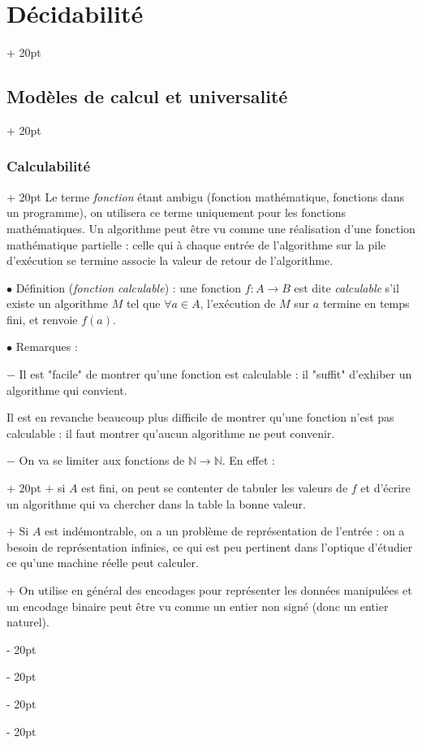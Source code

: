 \documentclass[a4paper, 12pt, twoside]{article}
\newcommand{\N}{\mathbb{N}} %
\newcommand{\ind}[1][20pt]{\advance\leftskip + #1}
\newcommand{\deind}[1][20pt]{\advance\leftskip - #1}
\newenvironment{indt}[2][20pt]{#2 \par \ind[#1]}{\par \deind} %
\begin{document}
\begin{indt}{\section{Décidabilité}}
\begin{indt}{\subsection{Modèles de calcul et universalité}}
\begin{indt}{\subsubsection{Calculabilité}}
                Le terme \emph{fonction} étant ambigu (fonction mathématique, fonctions dans un programme), on utilisera ce terme uniquement pour les fonctions mathématiques. Un algorithme peut être vu comme une réalisation d'une fonction mathématique partielle : celle qui à chaque entrée de l'algorithme sur la pile d'exécution se termine associe la valeur de retour de l'algorithme.

                \vspace{12pt}
                
                $\bullet$ Définition (\emph{fonction calculable}) : une fonction $f : A \longrightarrow B$ est dite \emph{calculable} s'il existe un algorithme $M$ tel que $\forall a \in A$, l'exécution de $M$ sur $a$ termine en temps fini, et renvoie $f(a)$.

                \vspace{12pt}
                
                $\bullet$ Remarques :

                $-$ Il est "facile" de montrer qu'une fonction est calculable : il "suffit" d'exhiber un algorithme qui convient.

                Il est en revanche beaucoup plus difficile de montrer qu'une fonction n'est pas calculable : il faut montrer qu'aucun algorithme ne peut convenir.

                \vspace{6pt}
                
                \begin{indt}{$-$ On va se limiter aux fonctions de $\N \longrightarrow \N$. En effet :}
                    $+$ si $A$ est fini, on peut se contenter de tabuler les valeurs de $f$ et d'écrire un algorithme qui va chercher dans la table la bonne valeur.

                    $+$ Si $A$ est indémontrable, on a un problème de représentation de l'entrée : on a besoin de représentation infinies, ce qui est peu pertinent dans l'optique d'étudier ce qu'une machine réelle peut calculer.

                    $+$ On utilise en général des encodages pour représenter les données manipulées et un encodage binaire peut être vu comme un entier non signé (donc un entier naturel).
                \end{indt}

                \vspace{12pt}
                

\end{indt}
\end{indt}
\end{indt}
\end{document}
